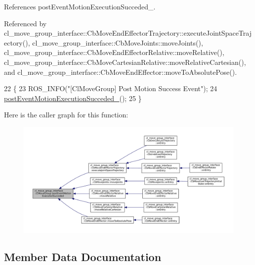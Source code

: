 References post\+Event\+Motion\+Execution\+Succeded\+\_\+.



Referenced by cl\+\_\+move\+\_\+group\+\_\+interface\+::\+Cb\+Move\+End\+Effector\+Trajectory\+::execute\+Joint\+Space\+Trajectory(), cl\+\_\+move\+\_\+group\+\_\+interface\+::\+Cb\+Move\+Joints\+::move\+Joints(), cl\+\_\+move\+\_\+group\+\_\+interface\+::\+Cb\+Move\+End\+Effector\+Relative\+::move\+Relative(), cl\+\_\+move\+\_\+group\+\_\+interface\+::\+Cb\+Move\+Cartesian\+Relative\+::move\+Relative\+Cartesian(), and cl\+\_\+move\+\_\+group\+\_\+interface\+::\+Cb\+Move\+End\+Effector\+::move\+To\+Absolute\+Pose().


\begin{DoxyCode}
22 \{
23     ROS\_INFO(\textcolor{stringliteral}{"[ClMoveGroup] Post Motion Success Event"});
24     \hyperlink{classcl__move__group__interface_1_1ClMoveGroup_a1e95dacf3393a4e4eff40395e8edfccd}{postEventMotionExecutionSucceded\_}();
25 \}
\end{DoxyCode}
Here is the caller graph for this function\+:
\nopagebreak
\begin{figure}[H]
\begin{center}
\leavevmode
\includegraphics[width=350pt]{classcl__move__group__interface_1_1ClMoveGroup_aebaf269db373d41837bae87651458e54_icgraph}
\end{center}
\end{figure}


\subsection{Member Data Documentation}
\mbox{\label{classcl__move__group__interface_1_1ClMoveGroup_a92922ea689e4e1b7b91512c56629c95b}} 
